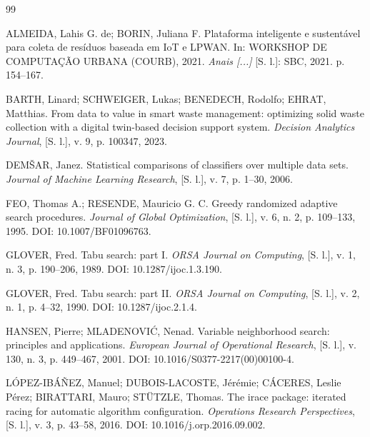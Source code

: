 \documentclass[12pt, a4paper]{article}
\begin{document}
\renewcommand{\bibsection}{\section*{Referências}}
\begin{thebibliography}{99}

ALMEIDA, Lahis G. de; BORIN, Juliana F. Plataforma inteligente e sustentável para coleta de resíduos baseada em IoT e LPWAN. In: WORKSHOP DE COMPUTAÇÃO URBANA (COURB), 2021. \textit{Anais [...]} [S. l.]: SBC, 2021. p. 154--167.

BARTH, Linard; SCHWEIGER, Lukas; BENEDECH, Rodolfo; EHRAT, Matthias. From data to value in smart waste management: optimizing solid waste collection with a digital twin-based decision support system. \textit{Decision Analytics Journal}, [S. l.], v. 9, p. 100347, 2023.

DEM\v{S}AR, Janez. Statistical comparisons of classifiers over multiple data sets. \textit{Journal of Machine Learning Research}, [S. l.], v. 7, p. 1--30, 2006.

FEO, Thomas A.; RESENDE, Mauricio G. C. Greedy randomized adaptive search procedures. \textit{Journal of Global Optimization}, [S. l.], v. 6, n. 2, p. 109--133, 1995. DOI: 10.1007/BF01096763.

GLOVER, Fred. Tabu search: part I. \textit{ORSA Journal on Computing}, [S. l.], v. 1, n. 3, p. 190--206, 1989. DOI: 10.1287/ijoc.1.3.190.

GLOVER, Fred. Tabu search: part II. \textit{ORSA Journal on Computing}, [S. l.], v. 2, n. 1, p. 4--32, 1990. DOI: 10.1287/ijoc.2.1.4.

HANSEN, Pierre; MLADENOVI\'C, Nenad. Variable neighborhood search: principles and applications. \textit{European Journal of Operational Research}, [S. l.], v. 130, n. 3, p. 449--467, 2001. DOI: 10.1016/S0377-2217(00)00100-4.

L\'OPEZ-IB\'A\~NEZ, Manuel; DUBOIS-LACOSTE, J\'er\'emie; C\'ACERES, Leslie P\'erez; BIRATTARI, Mauro; ST\"UTZLE, Thomas. The irace package: iterated racing for automatic algorithm configuration. \textit{Operations Research Perspectives}, [S. l.], v. 3, p. 43--58, 2016. DOI: 10.1016/j.orp.2016.09.002.


\end{thebibliography}
\end{document}
